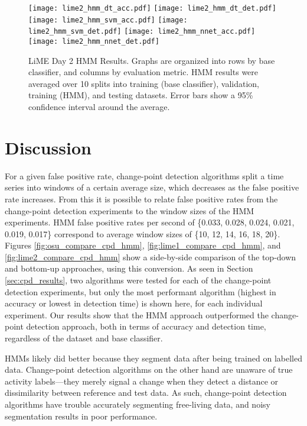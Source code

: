 \begin{figure}[H]
 \centering
 \texttt{[image: lime2\_hmm\_dt\_acc.pdf]} \hspace{1em}\vspace{1em}
 \texttt{[image: lime2\_hmm\_dt\_det.pdf]}
 \texttt{[image: lime2\_hmm\_svm\_acc.pdf]} \hspace{1em}\vspace{1em}
 \texttt{[image: lime2\_hmm\_svm\_det.pdf]}
 \texttt{[image: lime2\_hmm\_nnet\_acc.pdf]} \hspace{1em}
 \texttt{[image: lime2\_hmm\_nnet\_det.pdf]}
 \caption{LiME Day 2 HMM Results.
  Graphs are organized into rows by base classifier, and columns by evaluation
  metric. HMM results were averaged over 10 splits into training
  (base classifier), validation, training (HMM), and testing datasets. Error
  bars show a 95\% confidence interval around the average.}
 \label{fig:lime2_hmm}
\end{figure}

\newpage

\section{Discussion}

For a given false positive rate, change-point
detection algorithms split a time series into windows of a certain average size,
which decreases as the false positive rate increases. From this it is possible
to relate false positive rates from the change-point detection experiments to the window sizes of
the HMM experiments. HMM false positive rates per second of
\{0.033, 0.028, 0.024, 0.021, 0.019, 0.017\} correspond to average
window sizes of \{10, 12, 14, 16, 18, 20\}. Figures \ref{fig:osu_compare_cpd_hmm},
\ref{fig:lime1_compare_cpd_hmm}, and \ref{fig:lime2_compare_cpd_hmm}
show a side-by-side comparison of the top-down and bottom-up approaches, using
this conversion. As seen in Section \ref{sec:cpd_results}, two algorithms 
were tested for each of the change-point detection experiments, but only the
most performant algorithm (highest in accuracy or lowest in detection time) is 
shown here, for each individual experiment.
Our results show that the HMM approach outperformed the change-point
detection approach, both in terms of accuracy
and detection time, regardless of
the dataset and base classifier.

HMMs likely did better because they segment data after being trained on labelled
data. Change-point detection algorithms on the other hand are unaware of true
activity labels---they merely signal a change when they detect a distance or
dissimilarity between reference and test data. As such, change-point detection
algorithms have trouble accurately segmenting free-living data, and noisy
segmentation results in poor performance.

